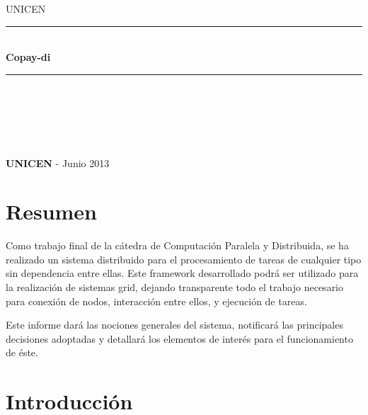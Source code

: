 \documentclass[12pt,a4paper,oneside,spanish]{report}
\newcommand{\HRule}{\rule{\linewidth}{0.5mm}}
\begin{document}
\begin{titlepage}
\begin{center}


\textsc{\LARGE UNICEN}\\[1.5cm]



\HRule \\[0.4cm]
{ \huge \bfseries Copay-di}\\[0.4cm]

\HRule \\[0.4cm]


\begin{center}
\textbf{}
\end{center}
~\\[3.5cm]


\textit{}


~\\[0.4cm]
\textit{} \textbf{} 

\vfill

{\large \textbf{UNICEN} - Junio 2013}

\end{center}
\end{titlepage}

\section*{Resumen}

Como trabajo final de la cátedra de Computación Paralela y Distribuida, se ha realizado un sistema distribuido para el procesamiento de tareas de cualquier tipo sin dependencia entre ellas. Este framework desarrollado podrá ser utilizado para la realización de sistemas grid, dejando transparente todo el trabajo necesario para conexión de nodos, interacción entre ellos, y ejecución de tareas.

Este informe dará las nociones generales del sistema, notificará las principales decisiones adoptadas y detallará los elementos de interés para el funcionamiento de éste.



\section*{Introducción}
\end{document}
